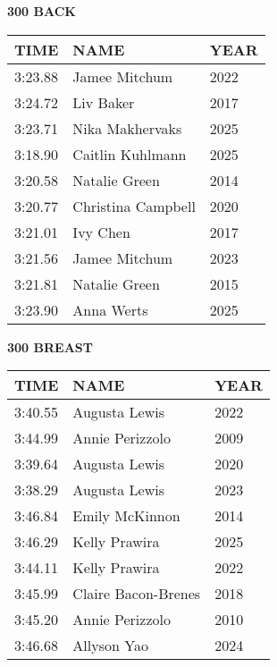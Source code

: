 \begin{table}[H]
\centering
\begin{minipage}[t]{0.48\textwidth}
\centering
\textbf{300 BACK}\\[0.1cm]
\begin{tabular}{@{}p{1.8cm}p{2.8cm}p{1.2cm}@{}}
\hline
    \textbf{TIME} & \textbf{NAME} & \textbf{YEAR} \\
\hline
    3:23.88 & Jamee Mitchum & 2022 \\
    3:24.72 & Liv Baker & 2017 \\
    3:23.71 & Nika Makhervaks & 2025 \\
    3:18.90 & Caitlin Kuhlmann & 2025 \\
    3:20.58 & Natalie Green & 2014 \\
    3:20.77 & Christina Campbell & 2020 \\
    3:21.01 & Ivy Chen & 2017 \\
    3:21.56 & Jamee Mitchum & 2023 \\
    3:21.81 & Natalie Green & 2015 \\
    3:23.90 & Anna Werts & 2025 \\
\hline
\end{tabular}
\end{minipage}\hfill
\begin{minipage}[t]{0.48\textwidth}
\centering
\textbf{300 BREAST}\\[0.1cm]
\begin{tabular}{@{}p{1.8cm}p{2.8cm}p{1.2cm}@{}}
\hline
    \textbf{TIME} & \textbf{NAME} & \textbf{YEAR} \\
\hline
    3:40.55 & Augusta Lewis & 2022 \\
    3:44.99 & Annie Perizzolo & 2009 \\
    3:39.64 & Augusta Lewis & 2020 \\
    3:38.29 & Augusta Lewis & 2023 \\
    3:46.84 & Emily McKinnon & 2014 \\
    3:46.29 & Kelly Prawira & 2025 \\
    3:44.11 & Kelly Prawira & 2022 \\
    3:45.99 & Claire Bacon-Brenes & 2018 \\
    3:45.20 & Annie Perizzolo & 2010 \\
    3:46.68 & Allyson Yao & 2024 \\
\hline
\end{tabular}
\end{minipage}
\end{table}

